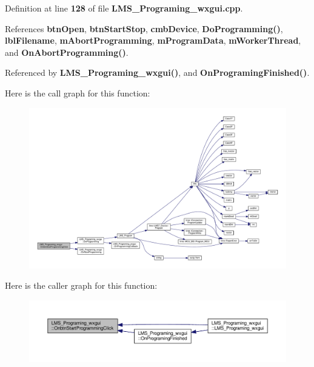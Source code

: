 Definition at line {\bf 128} of file {\bf L\+M\+S\+\_\+\+Programing\+\_\+wxgui.\+cpp}.



References {\bf btn\+Open}, {\bf btn\+Start\+Stop}, {\bf cmb\+Device}, {\bf Do\+Programming()}, {\bf lbl\+Filename}, {\bf m\+Abort\+Programming}, {\bf m\+Program\+Data}, {\bf m\+Worker\+Thread}, and {\bf On\+Abort\+Programming()}.



Referenced by {\bf L\+M\+S\+\_\+\+Programing\+\_\+wxgui()}, and {\bf On\+Programing\+Finished()}.



Here is the call graph for this function\+:
\nopagebreak
\begin{figure}[H]
\begin{center}
\leavevmode
\includegraphics[width=350pt]{db/d33/classLMS__Programing__wxgui_a19e7fd119068f89e511792ac90b80572_cgraph}
\end{center}
\end{figure}




Here is the caller graph for this function\+:
\nopagebreak
\begin{figure}[H]
\begin{center}
\leavevmode
\includegraphics[width=350pt]{db/d33/classLMS__Programing__wxgui_a19e7fd119068f89e511792ac90b80572_icgraph}
\end{center}
\end{figure}


